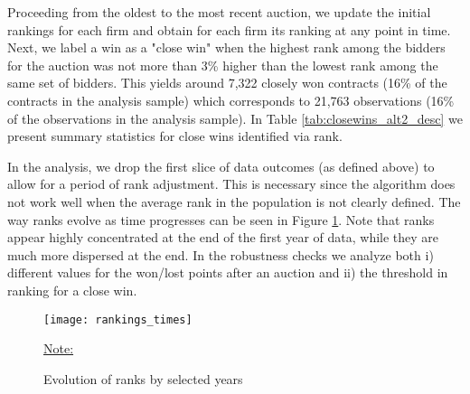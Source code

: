 Proceeding from the oldest to the most recent auction, we update the initial rankings for each firm and obtain for each firm its ranking at any point in time. Next, we label a win as a "close win" when the highest rank among the bidders for the auction was not more than 3\% higher than the lowest rank among the same set of bidders. This yields around 7,322 closely won contracts (16\% of the contracts in the analysis sample) which corresponds to 21,763 observations (16\% of the observations in the analysis sample). In Table \ref{tab:closewins_alt2_desc} we present summary statistics for close wins identified via rank.



In the analysis, we drop the first slice of data outcomes (as defined above) to allow for a period of rank adjustment. This is necessary since the algorithm does not work well when the average rank in the population is not clearly defined. The way ranks evolve as time progresses  can be seen in Figure \ref{fig:rankings_times}. Note that ranks appear highly concentrated at the end of the first year of data, while they are much more dispersed at the end. In the robustness checks we analyze both i) different values for the won/lost points after an auction and ii) the threshold in ranking for a close win.

\begin{figure}
  \texttt{[image: rankings\_times]}
  \caption{Evolution of ranks by selected years}
  \label{fig:rankings_times}
  \vskip 0.5mm
  { \footnotesize \underline{Note:} \par}
\end{figure}


